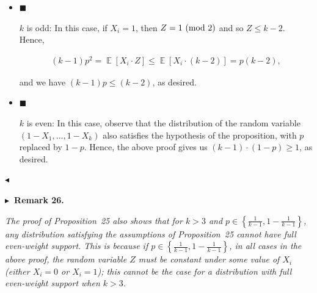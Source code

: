 \documentclass[10pt,a4paper]{article}
\begin{document}
\begin{itemize}


\item[] 
$\blacksquare$ 


$k$ is odd: In this case, if $X_{i}=1$, then $Z=1\textnormal{ (mod 2)}$ and so $Z\leqslant k-2$. Hence,\par


\[\begin{gathered}
(k-1)p^{2}=\mathop{\mathbb{E}}\left[X_{i}\cdot Z\right]\leqslant\mathop{\mathbb{E}}\left[X_{i}\cdot(k-2)\right]=p(k-2),
\end{gathered}\]


and we have $(k-1)p\leqslant(k-2)$, as desired.\par





\item[] 
$\blacksquare$ 


$k$ is even: In this case, observe that the distribution of the random variable $(1-X_{1},\dots,1-X_{k})$ also satisfies the hypothesis of the proposition, with $p$ replaced by $1-p$. Hence, the above proof gives us $(k-1)\cdot(1-p)\geqslant 1$, as desired.\par





\end{itemize}


$\blacktriangleleft$\par





\par\medskip\noindent\textbf{
$\blacktriangleright$ Remark 26.
}\par



\emph{The proof of Proposition 25 also shows that for $k>3$ and $p\in\left\{\frac{1}{k-1},1-\frac{1}{k-1}\right\}$, any distribution satisfying the assumptions of Proposition 25 cannot have full even-weight support.
This is because if $p\in\left\{\frac{1}{k-1},1-\frac{1}{k-1}\right\}$, in all cases in the above proof, the random variable $Z$ must be constant under some value of $X_{i}$ (either $X_{i}=0$ or $X_{i}=1$); this cannot be the case for a distribution with full even-weight support when $k>3$.}\par
\end{document}
